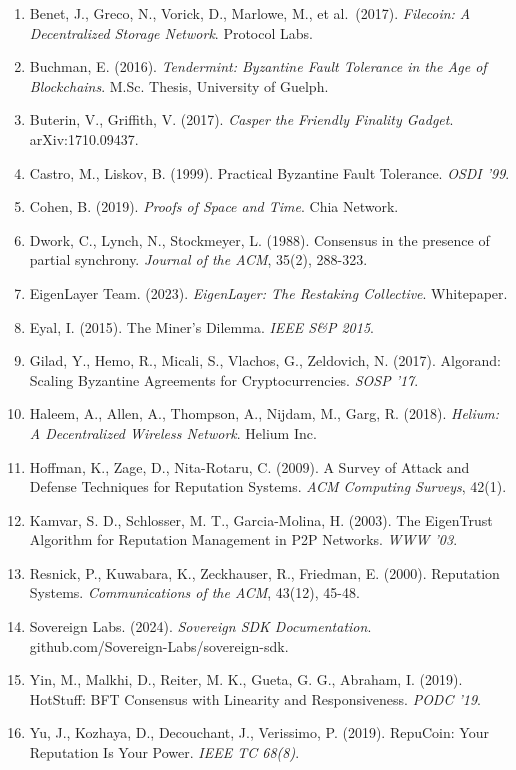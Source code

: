 \documentclass[
  11pt,
]{article}
\providecommand{\tightlist}{%
  \setlength{\itemsep}{0pt}\setlength{\parskip}{0pt}}
\begin{document}
\begin{enumerate}
\def\labelenumi{\arabic{enumi}.}
\tightlist
\item
  Benet, J., Greco, N., Vorick, D., Marlowe, M., et al.~(2017).
  \emph{Filecoin: A Decentralized Storage Network}. Protocol Labs.
\item
  Buchman, E. (2016). \emph{Tendermint: Byzantine Fault Tolerance in the
  Age of Blockchains}. M.Sc. Thesis, University of Guelph.
\item
  Buterin, V., Griffith, V. (2017). \emph{Casper the Friendly Finality
  Gadget}. arXiv:1710.09437.
\item
  Castro, M., Liskov, B. (1999). Practical Byzantine Fault Tolerance.
  \emph{OSDI '99}.
\item
  Cohen, B. (2019). \emph{Proofs of Space and Time}. Chia Network.
\item
  Dwork, C., Lynch, N., Stockmeyer, L. (1988). Consensus in the presence
  of partial synchrony. \emph{Journal of the ACM}, 35(2), 288-323.
\item
  EigenLayer Team. (2023). \emph{EigenLayer: The Restaking Collective}.
  Whitepaper.
\item
  Eyal, I. (2015). The Miner's Dilemma. \emph{IEEE S\&P 2015}.
\item
  Gilad, Y., Hemo, R., Micali, S., Vlachos, G., Zeldovich, N. (2017).
  Algorand: Scaling Byzantine Agreements for Cryptocurrencies.
  \emph{SOSP '17}.
\item
  Haleem, A., Allen, A., Thompson, A., Nijdam, M., Garg, R. (2018).
  \emph{Helium: A Decentralized Wireless Network}. Helium Inc.
\item
  Hoffman, K., Zage, D., Nita-Rotaru, C. (2009). A Survey of Attack and
  Defense Techniques for Reputation Systems. \emph{ACM Computing
  Surveys}, 42(1).
\item
  Kamvar, S. D., Schlosser, M. T., Garcia-Molina, H. (2003). The
  EigenTrust Algorithm for Reputation Management in P2P Networks.
  \emph{WWW '03}.
\item
  Resnick, P., Kuwabara, K., Zeckhauser, R., Friedman, E. (2000).
  Reputation Systems. \emph{Communications of the ACM}, 43(12), 45-48.
\item
  Sovereign Labs. (2024). \emph{Sovereign SDK Documentation}.
  github.com/Sovereign-Labs/sovereign-sdk.
\item
  Yin, M., Malkhi, D., Reiter, M. K., Gueta, G. G., Abraham, I. (2019).
  HotStuff: BFT Consensus with Linearity and Responsiveness. \emph{PODC
  '19}.
\item
  Yu, J., Kozhaya, D., Decouchant, J., Verissimo, P. (2019). RepuCoin:
  Your Reputation Is Your Power. \emph{IEEE TC 68(8)}.
\end{enumerate}
\end{document}
